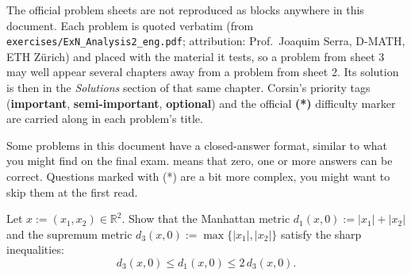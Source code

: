 \begin{ainote}
The official problem sheets are not reproduced as blocks anywhere in this document. Each problem
is quoted verbatim (from \texttt{exercises/ExN\_Analysis2\_eng.pdf}; attribution: Prof.\ Joaquim
Serra, D-MATH, ETH Z\"urich) and placed with the material it tests, so a problem from sheet 3 may
well appear several chapters away from a problem from sheet 2. Its solution is then in the
\emph{Solutions} section of that same chapter. Corsin's priority tags (\textbf{important},
\textbf{semi-important}, \textbf{optional}) and the official \textbf{(*)} difficulty marker are
carried along in each problem's title.
\end{ainote}

\begin{notation}
Some problems in this document have a closed-answer format, similar to what you might find on the
final exam.  means that zero, one or more answers can be correct. Questions
marked with (*) are a bit more complex, you might want to skip them at the first read.
\end{notation}


\begin{aiexercise}
\label{ex:ai_metric_equivalence}
Let $x := (x_1, x_2) \in \mathbb{R}^2$. Show that the Manhattan metric $d_1(x,0) := |x_1| + |x_2|$ and the supremum metric $d_3(x,0) := \max\{|x_1|, |x_2|\}$ satisfy the sharp inequalities:
\[
d_3(x,0) \leq d_1(x,0) \leq 2 \, d_3(x,0).
\]
\end{aiexercise}


